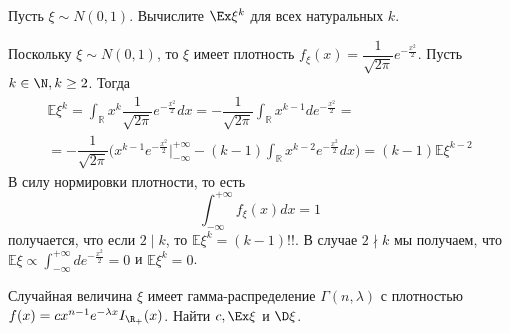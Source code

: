 \begin{problem}
    Пусть $\xi \sim N(0, 1)$.
    Вычислите $\Ex \xi^k$ для всех натуральных $k$.
\end{problem}
\begin{solution}
    Поскольку $\xi \sim N(0, 1)$, то $\xi$ имеет плотность $f_\xi(x) = \dfrac{1}{\sqrt{2\pi}}e^{-\frac{x^2}{2}}$. Пусть $k \in \N, k \geq 2$. Тогда
    \begin{multline*}
        \mathbb{E}\xi^k = \int_\mathbb{R}x^k\dfrac{1}{\sqrt{2\pi}}e^{-\frac{x^2}{2}}dx =  -\dfrac{1}{\sqrt{2\pi}}\int_\mathbb{R}x^{k - 1}de^{-\frac{x^2}{2}} = \\ = -\dfrac{1}{\sqrt{2\pi}}\biggr(x^{k - 1}e^{-\frac{x^2}{2}}\big|_{-\infty}^{+\infty} - (k - 1)\int_\mathbb{R}x^{k - 2}e^{-\frac{x^2}{2}}dx\biggr) = (k - 1)\mathbb{E}\xi^{k - 2}
    \end{multline*}
    В силу нормировки плотности, то есть \[
                                             \int_{-\infty}^{+\infty}f_\xi(x)dx = 1
    \]
    получается, что если $2 \mid k$, то $\mathbb{E}\xi^k = (k - 1)!!$. В случае $2 \nmid k$ мы получаем, что $\mathbb{E}\xi \propto \int_{-\infty}^{+\infty}de^{-\frac{x^2}{2}} = 0$ и $\mathbb{E}\xi^k = 0$.
\end{solution}
\begin{problem}
    Случайная величина $\xi$ имеет гамма-распределение $\Gamma(n, \lambda)$ с плотностью $f(x) = cx^{n - 1}e^{-\lambda x}I_{\R_+}(x)$.
    Найти $c, \Ex \xi$ и $\D \xi$.
\end{problem}

